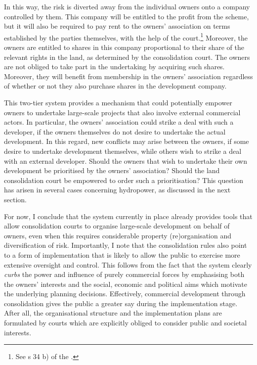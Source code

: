 In this way, the risk is diverted away from the individual owners onto a company controlled by them. This company will be entitled to the profit from the scheme, but it will also be required to pay rent to the owners' association on terms established by the parties themselves, with the help of the court.\footnote{See s 34 b) of the \cite{lca79}.} Moreover, the owners are entitled to shares in this company proportional to their share of the relevant rights in the land, as determined by the consolidation court. The owners are not obliged to take part in the undertaking by acquiring such shares. Moreover, they will benefit from membership in the owners' association regardless of whether or not they also purchase shares in the development company.

This two-tier system provides a mechanism that could potentially empower owners to undertake large-scale projects that also involve external commercial actors. In particular, the owners' association could  strike a deal with such a developer, if the owners themselves do not desire to undertake the actual development. In this regard, new conflicts may arise between the owners, if some desire to undertake development themselves, while others wish to strike a deal with an external developer. Should the owners that wish to undertake their own development be prioritised by the owners' association? Should the land consolidation court be empowered to order such a prioritisation? This question has arisen in several cases concerning hydropower, as discussed in the next section.


For now, I conclude that the system currently in place already provides tools that allow consolidation courts to organise large-scale development on behalf of owners, even when this requires considerable property (re)organisation and diversification of risk. Importantly, I note that the consolidation rules also point to a form of implementation that is likely to allow the public to exercise more extensive oversight and control. This follows from the fact that the system clearly \emph{curbs} the power and influence of purely commercial forces by emphasising both the owners' interests and the social, economic and political aims which motivate the underlying planning decisions. Effectively, commercial development through consolidation gives the public a greater say during the implementation stage. After all, the organisational structure and the implementation plans are formulated by courts which are explicitly obliged to consider public and societal interests.

